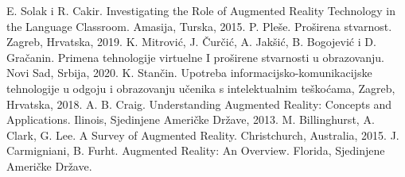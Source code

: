 \documentclass[a4paper]{article}
\begin{document}

        
        \begin{thebibliography}{9}
         E. Solak i R. Cakir. Investigating the Role of Augmented Reality Technology in the Language Classroom. Amasija, 
	Turska, 2015.
         P. Pleše. Proširena stvarnost. Zagreb, Hrvatska, 2019.
         K. Mitrović, J. Čurčić, A. Jakšić, B. Bogojević i D. Gračanin. Primena tehnologije virtuelne I proširene 
	stvarnosti u obrazovanju. Novi Sad, Srbija, 2020.
         K. Stančin. Upotreba informacijsko-komunikacijske tehnologije u odgoju i obrazovanju učenika s 
	intelektualnim teškoćama, Zagreb, Hrvatska, 2018.
         A. B. Craig. Understanding Augmented Reality: Concepts and Applications. Ilinois, Sjedinjene Američke 
	Države, 2013.
		 M. Billinghurst, A. Clark, G. Lee. A Survey of Augmented Reality. Christchurch, Australia, 2015.
		 J. Carmigniani, B. Furht. Augmented Reality: An Overview. Florida, Sjedinjene Američke Države.
 
        \end{thebibliography}
\end{document}
